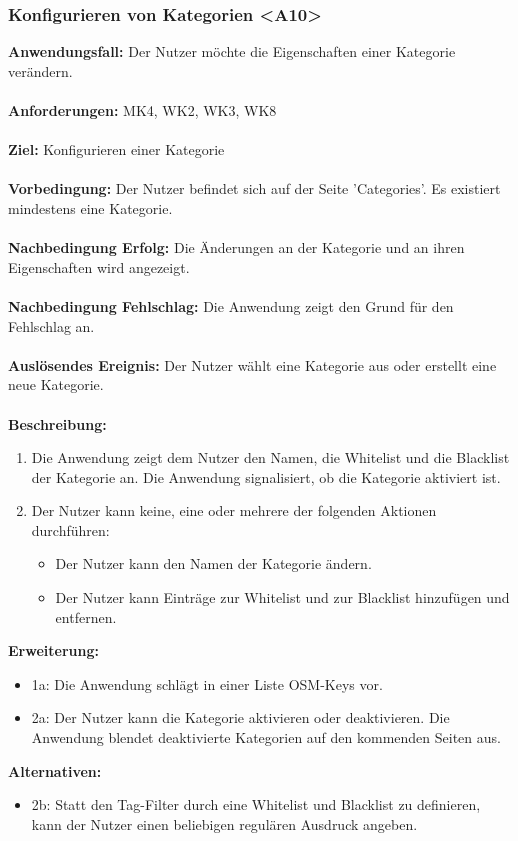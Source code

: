 \documentclass[parskip=full]{scrartcl} %
\begin{document}
\subsubsection*{Konfigurieren von Kategorien <A10>}
\textbf{Anwendungsfall:} Der Nutzer möchte die Eigenschaften einer Kategorie verändern.\\\\
\textbf{Anforderungen:} MK4, WK2, WK3, WK8\\\\
\textbf{Ziel:} Konfigurieren einer Kategorie \\\\
\textbf{Vorbedingung:} Der Nutzer befindet sich auf der Seite 'Categories'. Es existiert mindestens eine Kategorie.\\\\
\textbf{Nachbedingung Erfolg:} Die Änderungen an der Kategorie und an ihren Eigenschaften wird angezeigt. \\\\
\textbf{Nachbedingung Fehlschlag:} Die Anwendung zeigt den Grund für den Fehlschlag an. \\\\
\textbf{Auslösendes Ereignis:} Der Nutzer wählt eine Kategorie aus oder erstellt eine neue Kategorie. \\\\
\textbf{Beschreibung:}
\begin{enumerate}
    \item Die Anwendung zeigt dem Nutzer den Namen, die Whitelist und die Blacklist der Kategorie an. Die Anwendung signalisiert, ob die Kategorie aktiviert ist.
    \item Der Nutzer kann keine, eine oder mehrere der folgenden Aktionen durchführen:
    \begin{itemize}
        \item Der Nutzer kann den Namen der Kategorie ändern.
        \item Der Nutzer kann Einträge zur Whitelist und zur Blacklist hinzufügen und entfernen.
    \end{itemize}
\end{enumerate}
\textbf{Erweiterung:}
\begin{itemize}
    \item 1a: Die Anwendung schlägt in einer Liste OSM-Keys vor.
    \item 2a: Der Nutzer kann die Kategorie aktivieren oder deaktivieren. Die Anwendung blendet deaktivierte Kategorien auf den kommenden Seiten aus.
\end{itemize}
\textbf{Alternativen:}
\begin{itemize}
    \item 2b: Statt den Tag-Filter durch eine Whitelist und Blacklist zu definieren, kann der Nutzer einen beliebigen regulären Ausdruck angeben.
\end{itemize}
\newpage
\end{document}
